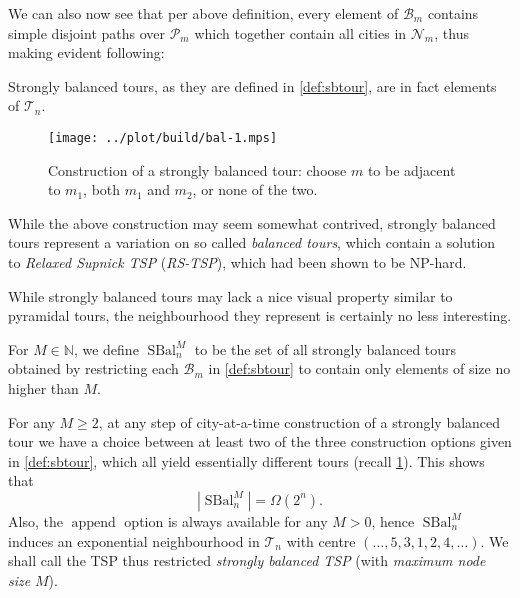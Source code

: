 \documentclass[index=totoc,bibliography=totoc]{scrartcl}
\newcommand{\annotation}[1]{\marginpar{\small\itshape\color{green}#1}}
\numberwithin{equation}{section}
\numberwithin{figure}{section}
\numberwithin{table}{section}
\let\defstyle\itshape
\begin{document}
We can also now see that per above definition, every element of $\mathcal{B}_m$ contains
simple disjoint paths over $\mathcal{P}_m$ which together
contain all cities in $\mathcal{N}_m$, thus making evident following:
\begin{remark}
  Strongly balanced tours, as they are defined in \cref{def:sbtour},
  are in fact elements of $\mathcal{T}_n$.
\end{remark}

\begin{figure}[hbt]
  \centering
  \texttt{[image: ../plot/build/bal-1.mps]}
  \caption{%
    Construction of a strongly balanced tour:
    choose $m$ to be adjacent to $m_1$, both $m_1$ and $m_2$, or none of the two.
 }
 \label{fig:sbopt}
\end{figure}

While the above construction may seem somewhat contrived, strongly balanced tours
represent a variation on so called {\defstyle balanced tours}, which contain a solution
to {\defstyle Relaxed Supnick TSP} ({\defstyle RS-TSP}), which had been shown to be NP-hard.
\annotation{Cite someone!  Adjust description.}

While strongly balanced tours may lack a nice visual property similar to
pyramidal tours, the neighbourhood they represent is certainly no less
interesting.

\begin{define}
For $M \in \mathbb{N}$, we define $\operatorname{SBal}_n^M$ to be the set of all
strongly balanced tours obtained by restricting each $\mathcal{B}_m$ in \cref{def:sbtour}
to contain only elements of size no higher than $M$.
\end{define}

\begin{remark}
  For any $M \geq 2$, at any step of city-at-a-time construction of a
  strongly balanced tour we have a choice between at least two of the three
  construction options given in \cref{def:sbtour}, which all yield essentially
  different tours (recall \cref{fig:sbopt}).  This shows that
  \[
    \left|\operatorname{SBal}_n^M\right| = \Omega\left(2^n\right).
  \]
  Also, the $\operatorname{append}$ option is always available for any $M>0$,
  hence $\operatorname{SBal}_n^M$ induces an exponential neighbourhood
  in $\mathcal{T}_n$ with centre $\left(\ldots,5,3,1,2,4,\ldots\right)$.
  We shall call the TSP thus restricted {\defstyle strongly balanced TSP}
  (with {\defstyle maximum node size} $M$).
\end{remark}
\end{document}
